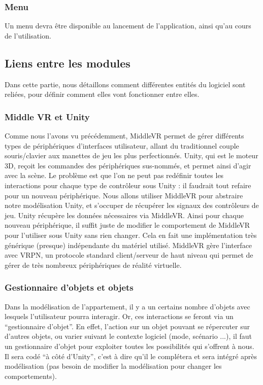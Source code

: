 		\subsubsection{Menu}
			Un menu devra être disponible au lancement de l'application, ainsi qu'au cours de l'utilisation.

%
%
\subsection{Liens entre les modules}
Dans cette partie, nous détaillons comment différentes entités du logiciel sont reliées, pour définir comment elles vont fonctionner entre elles.

\subsubsection{Middle VR et Unity}
Comme nous l'avons vu précédemment, MiddleVR permet de gérer différents types de périphériques d'interfaces utilisateur, allant du traditionnel couple souris/clavier aux manettes de jeu les plus perfectionnés.
Unity, qui est le moteur 3D, reçoit les commandes des périphériques sus-nommés, et permet ainsi d'agir avec la scène.
Le problème est que l'on ne peut pas redéfinir toutes les interactions pour chaque type de contrôleur sous Unity : il faudrait tout refaire pour un nouveau périphérique.
Nous allons utiliser MiddleVR pour abstraire notre modélisation Unity, et s'occuper de récupérer les signaux des contrôleurs de jeu. Unity récupère les données nécessaires via MiddleVR.
Ainsi pour chaque nouveau périphérique, il suffit juste de modifier le comportement de MiddleVR pour l'utiliser sous Unity sans rien changer.
Cela en fait une implémentation très générique (presque) indépendante du matériel utilisé.
MiddleVR gère l'interface avec VRPN, un protocole standard client/serveur de haut niveau qui permet de gérer de très nombreux périphériques de réalité virtuelle.

\subsubsection{Gestionnaire d'objets et objets}

Dans la modélisation de l'appartement, il y a un certains nombre d'objets avec lesquels l'utilisateur pourra interagir.
Or, ces interactions se feront via un \enquote{gestionnaire d'objet}.
En effet, l'action sur un objet pouvant se répercuter sur d'autres objets, ou varier suivant le contexte logiciel (mode, scénario ...), il faut un gestionnaire d'objet pour exploiter toutes les possibilités qui s'offrent à nous.
Il sera codé \enquote{à côté d'Unity}, c'est à dire qu'il le complétera et sera intégré après modélisation (pas besoin de modifier la modélisation pour changer les comportements).

